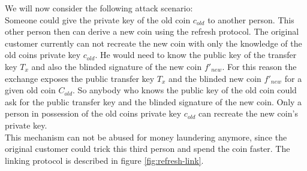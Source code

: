     We will now consider the following attack scenario:\\
    Someone could give the private key of the old coin $c_{old}$ to another person.
    This other person then can derive a new coin using the refresh protocol.
    The original customer currently can not recreate the new coin with only the knowledge of the old coins private key $c_{old}$.
    He would need to know the public key of the transfer key $T_x$ and also the blinded signature of the new coin $f'_{new}$.
    For this reason the exchange exposes the public transfer key $T_x$ and the blinded new coin $f'_{new}$ for a given old coin $C_{old}$.
    So anybody who knows the public key of the old coin could ask for the public transfer key and the blinded signature of the new coin.
    Only a person in possession of the old coins private key $c_{old}$ can recreate the new coin's private key. \\
This mechanism can not be abused for money laundering anymore, since the original customer could trick this third person and spend the coin faster.
The linking protocol is described in figure \ref{fig:refresh-link}.

